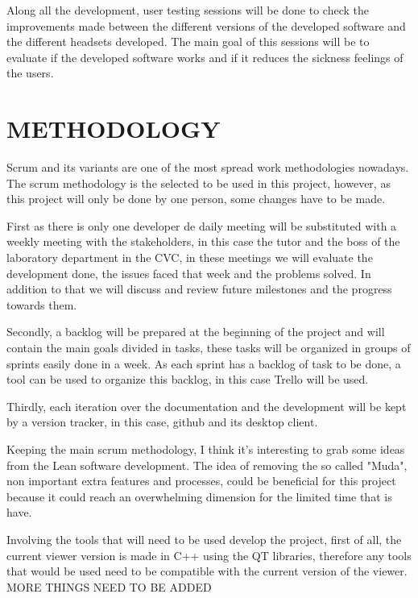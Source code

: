 \documentclass[10pt,a4paper,twocolumn,twoside]{article}
\begin{document}
Along all the development, user testing sessions will be done to check the improvements made between the different versions of the developed software and the different headsets developed. The main goal of this sessions will be to evaluate if the developed software works and if it reduces the sickness feelings of the users.

\section{METHODOLOGY}
Scrum and its variants are one of the most spread work methodologies nowadays.
The scrum methodology is the selected to be used in this project, however, as this project will only be done by one person, some changes have to be made. 

First as there is only one developer de daily meeting will be substituted with a weekly meeting with the stakeholders, in this case the tutor and the boss of the laboratory department in the CVC, in these meetings we will evaluate the development done, the issues faced that week and the problems solved. In addition to that we will discuss and review future milestones and the progress towards them.

Secondly, a backlog will be prepared at the beginning of the project and will contain the main goals divided in tasks, these tasks will be organized in groups of sprints easily done in a week. As each sprint has a backlog of task to be done, a tool can be used to organize this backlog, in this case Trello\cite{trello} will be used.

Thirdly, each iteration over the documentation and the development will be kept by a version tracker, in this case, github\cite{github} and its desktop client\cite{githubDesktop}. 

Keeping the main scrum methodology, I think it's interesting to grab some ideas from the Lean software development\cite{leanMethod}. The idea of removing the so called "Muda", non important extra features and processes, could be beneficial for this project because it could reach an overwhelming dimension for the limited time that is have.


Involving the tools that will need to be used develop the project, first of all, the current viewer version is made in C++ using the QT libraries\cite{qt}, therefore any tools that would be used need to be compatible with the current version of the viewer. MORE THINGS NEED TO BE ADDED
\end{document}
